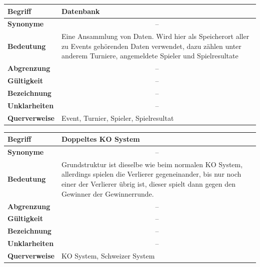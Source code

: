 \documentclass[11pt]{article}
\begin{document}
\begin{tabularx}{\textwidth}{| p{} | p{} |}
	\hline
	\textbf{Begriff} & Datenbank\\
	\hline
	\textbf{Synonyme} & \multicolumn{1}{c|}{--} \\
	\hline
	\textbf{Bedeutung} & Eine Ansammlung von Daten. Wird hier als Speicherort aller zu Events gehörenden Daten verwendet, dazu zählen unter anderem Turniere, angemeldete Spieler und Spielresultate\\
	\hline
	\textbf{Abgrenzung} & \multicolumn{1}{c|}{--} \\
	\hline
	\textbf{Gültigkeit} & \multicolumn{1}{c|}{--} \\
	\hline
	\textbf{Bezeichnung} & \multicolumn{1}{c|}{--} \\
	\hline
	\textbf{Unklarheiten} & \multicolumn{1}{c|}{--} \\
	\hline
	\textbf{Querverweise} & Event, Turnier, Spieler, Spielresultat\\
	\hline
\end{tabularx}

\newpage

\begin{tabularx}{\textwidth}{| p{} | p{} |}
	\hline
	\textbf{Begriff} & Doppeltes KO System\\ 
	\hline
	\textbf{Synonyme} & \multicolumn{1}{c|}{--}\\
	\hline 
	\textbf{Bedeutung} & Grundstruktur ist dieselbe wie beim normalen KO System, allerdings spielen die Verlierer gegeneinander, bis nur noch einer der Verlierer übrig ist, dieser spielt dann gegen den Gewinner der Gewinnerrunde.\\
	\hline
	\textbf{Abgrenzung} & \multicolumn{1}{c|}{--}\\
	\hline
	\textbf{Gültigkeit} & \multicolumn{1}{c|}{--}\\
	\hline
	\textbf{Bezeichnung} & \multicolumn{1}{c|}{--}\\
	\hline
	\textbf{Unklarheiten} & \multicolumn{1}{c|}{--} \\
	\hline
	\textbf{Querverweise} & KO System, Schweizer System\\
	\hline
\end{tabularx}
\end{document}
